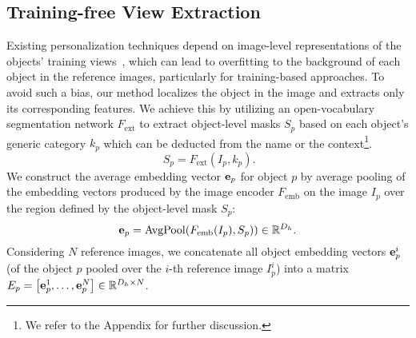 \subsection{Training-free View Extraction}
\vspace{-0.1cm}
\label{sec:training_views}
Existing \VLM personalization techniques depend on image-level representations of the objects’ training views~\cite{alaluf2024myvlm,nguyen2024yo}, which can lead to overfitting to the background of each object in the reference images, particularly for training-based approaches. To avoid such a bias,
our method localizes the object in the image and extracts only its corresponding features.
We achieve this by utilizing an open-vocabulary segmentation network $F_\text{ext}$ to extract object-level masks $S_p$ based on each object's generic category $k_p$ which can be deducted from the name or the context\footnote{We refer to the Appendix for further discussion. }. 
\begin{equation}~\label{eq:ext}
    S_p = F_\text{ext}(I_p,k_p).%
\end{equation}
We construct the average embedding vector $\mathbf{e}_p$ for object $p$ by average pooling of the embedding vectors produced by the image encoder $F_\text{emb}$ on the image $I_p$ over the region defined by the object-level mask $S_p$:
\vspace{-0.3cm}
\begin{equation}
    \mathbf{e}_p=\operatorname{AvgPool}(F_\text{emb}{(I_p),S_p)})\in\mathbb{R}^{D_h}.
\end{equation}
Considering $N$ reference images, we concatenate all object embedding vectors $\mathbf{e}_p^i$ (of the object $p$ pooled over the $i$-th reference image $I_p^i$) into a matrix $E_p = \left[\mathbf{e}_p^1, \dots, \mathbf{e}_p^N\right]\in\mathbb{R}^{D_h \times N}$.

